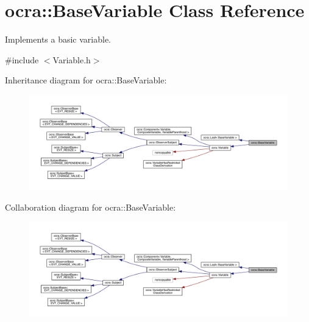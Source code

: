 \hypertarget{classocra_1_1BaseVariable}{}\section{ocra\+:\+:Base\+Variable Class Reference}
\label{classocra_1_1BaseVariable}


Implements a basic variable.  




{\ttfamily \#include $<$Variable.\+h$>$}



Inheritance diagram for ocra\+:\+:Base\+Variable\+:\nopagebreak
\begin{figure}[H]
\begin{center}
\leavevmode
\includegraphics[width=350pt]{db/ddd/classocra_1_1BaseVariable__inherit__graph}
\end{center}
\end{figure}


Collaboration diagram for ocra\+:\+:Base\+Variable\+:\nopagebreak
\begin{figure}[H]
\begin{center}
\leavevmode
\includegraphics[width=350pt]{d1/d35/classocra_1_1BaseVariable__coll__graph}
\end{center}
\end{figure}
